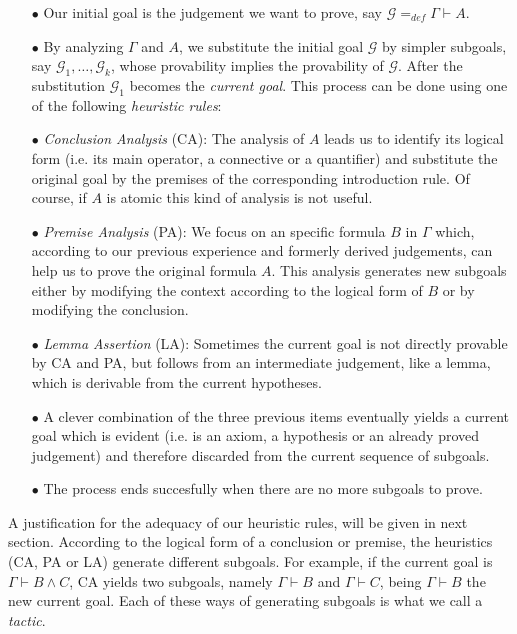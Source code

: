 \documentclass[a4paper,UKenglish]{lipics}
\newcommand{\G}{\Gamma}
\newcommand{\Ge}{\mathcal{G}}
\newcommand{\eqdef}{=_{def}}
\begin{document}
\begin{itemize}
\item[$\bullet$]Our initial goal is the judgement we want to prove, say $\Ge\eqdef\G\vdash A$.
\item[$\bullet$]By analyzing $\G$ and $A$, we substitute the initial goal $\Ge$ by simpler subgoals, say $\Ge_1,\ldots,\Ge_k$, whose provability implies the provability of $\Ge$. After the substitution $\Ge_1$ becomes the {\sl current goal}. This process can be done using one of the following {\em heuristic rules}:
\item[$\bullet$] {\em Conclusion Analysis} (CA): The analysis of $A$ leads us to identify its 
logical form (i.e. its main operator, a connective or a quantifier) and substitute the original goal by the premises of the corresponding introduction rule. Of course, if $A$ is atomic this kind of analysis is not useful. 
\item[$\bullet$]{\em Premise Analysis} (PA): We focus on an specific formula $B$ in $\G$ which, according to our previous experience and formerly derived judgements, can help us to prove the original formula $A$. This analysis generates new subgoals either by modifying the context according to the logical form of $B$ or by modifying the conclusion. 
\item[$\bullet$]{\em Lemma Assertion} (LA): Sometimes the current goal is not directly provable by CA and PA, but follows from an intermediate judgement, like a lemma, which is derivable from the current hypotheses.   
\item[$\bullet$]A clever combination of the three previous items eventually yields a current goal which is evident (i.e. is an axiom, a hypothesis or an already proved judgement) and therefore discarded from the current sequence of subgoals.
\item[$\bullet$]The process ends succesfully when there are no more subgoals to prove. \\
\end{itemize}

A justification for the adequacy of our heuristic rules, will be given in next section.  According to the logical form of a conclusion or premise, the heuristics (CA, PA or LA) generate different subgoals. For example, if the current goal is $\G\vdash B\land C$, CA yields two subgoals, namely $\G\vdash B$ and $\G\vdash C$, being $\G\vdash B$ the new current goal. Each of these ways of generating subgoals is what we call a {\em tactic}.  \\
\end{document}
